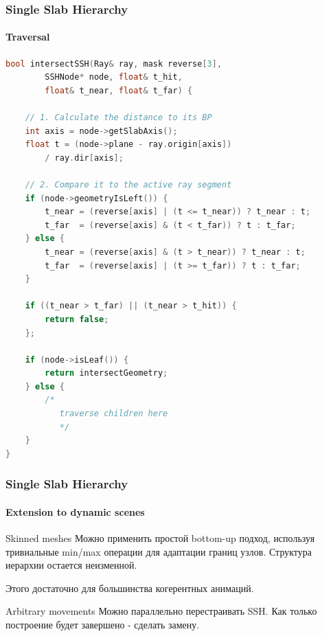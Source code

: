 \documentclass{beamer}
\begin{document}
\begin{frame}[fragile]
    \frametitle{Single Slab Hierarchy}
    \framesubtitle{Traversal}
    \begin{lstlisting}[language=C++,basicstyle=\ttfamily,keywordstyle=\color{red}]
bool intersectSSH(Ray& ray, mask reverse[3],
        SSHNode* node, float& t_hit,
        float& t_near, float& t_far) {

    // 1. Calculate the distance to its BP
    int axis = node->getSlabAxis();
    float t = (node->plane - ray.origin[axis])
        / ray.dir[axis];

    // 2. Compare it to the active ray segment
    if (node->geometryIsLeft()) {
        t_near = (reverse[axis] | (t <= t_near)) ? t_near : t;
        t_far  = (reverse[axis] & (t < t_far)) ? t : t_far;
    } else {
        t_near = (reverse[axis] & (t > t_near)) ? t_near : t;
        t_far  = (reverse[axis] | (t >= t_far)) ? t : t_far;
    }

    if ((t_near > t_far) || (t_near > t_hit)) {
        return false;
    };

    if (node->isLeaf()) {
        return intersectGeometry;
    } else {
        /*
           traverse children here
           */
    }
}
    \end{lstlisting}
\end{frame}

\begin{frame}
    \frametitle{Single Slab Hierarchy}
    \framesubtitle{Extension to dynamic scenes}
    \begin{block}{Skinned meshes}
    Можно применить простой bottom-up подход,
    используя тривиальные min/max операции для адаптации границ узлов.
    Структура иерархии остается неизменной.

    Этого достаточно для большинства когерентных анимаций.
    \end{block}

    \begin{block}{Arbitrary movements}
    Можно параллельно перестраивать SSH. Как только построение будет завершено - сделать замену.
    \end{block}

\end{frame}
\end{document}
